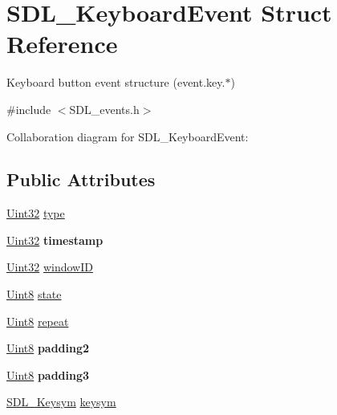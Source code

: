 \hypertarget{struct_s_d_l___keyboard_event}{}\section{S\+D\+L\+\_\+\+Keyboard\+Event Struct Reference}
\label{struct_s_d_l___keyboard_event}


Keyboard button event structure (event.\+key.$\ast$)  




{\ttfamily \#include $<$S\+D\+L\+\_\+events.\+h$>$}



Collaboration diagram for S\+D\+L\+\_\+\+Keyboard\+Event\+:
\subsection*{Public Attributes}
\begin{DoxyCompactItemize}
\item 
\hyperlink{_s_d_l__stdinc_8h_add440eff171ea5f55cb00c4a9ab8672d}{Uint32} \hyperlink{struct_s_d_l___keyboard_event_ae0b2f2aace6f80c1f47e5a14350d409a}{type}
\item 
\hypertarget{struct_s_d_l___keyboard_event_a3da1d8f6892e7f6ee28d9eafdb5e7d02}{}\hyperlink{_s_d_l__stdinc_8h_add440eff171ea5f55cb00c4a9ab8672d}{Uint32} {\bfseries timestamp}\label{struct_s_d_l___keyboard_event_a3da1d8f6892e7f6ee28d9eafdb5e7d02}

\item 
\hyperlink{_s_d_l__stdinc_8h_add440eff171ea5f55cb00c4a9ab8672d}{Uint32} \hyperlink{struct_s_d_l___keyboard_event_a56efb6780b96acd5b50d8f797efb3546}{window\+I\+D}
\item 
\hyperlink{_s_d_l__stdinc_8h_a2944638813a090aa23e62f4da842c3e2}{Uint8} \hyperlink{struct_s_d_l___keyboard_event_a110558eb96c113c86cfa31a7018c2346}{state}
\item 
\hyperlink{_s_d_l__stdinc_8h_a2944638813a090aa23e62f4da842c3e2}{Uint8} \hyperlink{struct_s_d_l___keyboard_event_a3edac3b36304812d533795c9df4ed4c1}{repeat}
\item 
\hypertarget{struct_s_d_l___keyboard_event_ae270122f757f76171318294afd2c95e6}{}\hyperlink{_s_d_l__stdinc_8h_a2944638813a090aa23e62f4da842c3e2}{Uint8} {\bfseries padding2}\label{struct_s_d_l___keyboard_event_ae270122f757f76171318294afd2c95e6}

\item 
\hypertarget{struct_s_d_l___keyboard_event_ae1831035ef556a7b09efcd2469f26f7a}{}\hyperlink{_s_d_l__stdinc_8h_a2944638813a090aa23e62f4da842c3e2}{Uint8} {\bfseries padding3}\label{struct_s_d_l___keyboard_event_ae1831035ef556a7b09efcd2469f26f7a}

\item 
\hyperlink{struct_s_d_l___keysym}{S\+D\+L\+\_\+\+Keysym} \hyperlink{struct_s_d_l___keyboard_event_a2a57ba820a298f2c02ad5d41fd2b1aa8}{keysym}
\end{DoxyCompactItemize}


